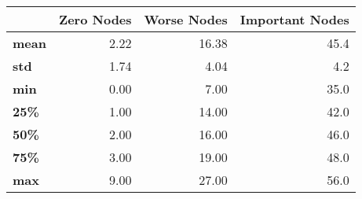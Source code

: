 \begin{tabular}{lrrr}
\toprule
{} &  Zero Nodes &  Worse Nodes &  Important Nodes \\
\midrule
\textbf{mean} &        2.22 &        16.38 &             45.4 \\
\textbf{std } &        1.74 &         4.04 &              4.2 \\
\textbf{min } &        0.00 &         7.00 &             35.0 \\
\textbf{25\% } &        1.00 &        14.00 &             42.0 \\
\textbf{50\% } &        2.00 &        16.00 &             46.0 \\
\textbf{75\% } &        3.00 &        19.00 &             48.0 \\
\textbf{max } &        9.00 &        27.00 &             56.0 \\
\bottomrule
\end{tabular}

